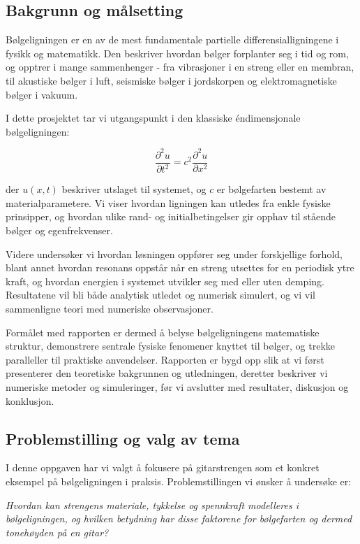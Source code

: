 \subsection{Bakgrunn og målsetting}
Bølgeligningen er en av de mest fundamentale partielle differensialligningene i fysikk og matematikk. 
Den beskriver hvordan bølger forplanter seg i tid og rom, og opptrer i mange sammenhenger - fra 
vibrasjoner i en streng eller en membran, til akustiske bølger i luft, seismiske bølger i jordskorpen 
og elektromagnetiske bølger i vakuum. 

I dette prosjektet tar vi utgangspunkt i den klassiske éndimensjonale bølgeligningen:

\begin{equation}
    \frac{\partial^2 u}{\partial t^2} = c^2 \frac{\partial^2 u}{\partial x^2}
    \label{eq:bølgeligningen}
\end{equation}

der $u(x,t)$ beskriver utslaget til systemet, og $c$ er bølgefarten bestemt av materialparametere. 
Vi viser hvordan ligningen kan utledes fra enkle fysiske prinsipper, og hvordan ulike rand- og 
initialbetingelser gir opphav til stående bølger og egenfrekvenser. 

Videre undersøker vi hvordan løsningen oppfører seg under forskjellige forhold, blant annet hvordan 
resonans oppstår når en streng utsettes for en periodisk ytre kraft, og hvordan energien i systemet 
utvikler seg med eller uten demping. Resultatene vil bli både analytisk utledet og numerisk simulert, 
og vi vil sammenligne teori med numeriske observasjoner. 

Formålet med rapporten er dermed å belyse bølgeligningens matematiske struktur, demonstrere sentrale 
fysiske fenomener knyttet til bølger, og trekke paralleller til praktiske anvendelser. Rapporten er 
bygd opp slik at vi først presenterer den teoretiske bakgrunnen og utledningen, deretter beskriver vi 
numeriske metoder og simuleringer, før vi avslutter med resultater, diskusjon og konklusjon.

\subsection{Problemstilling og valg av tema}

I denne oppgaven har vi valgt å fokusere på gitarstrengen som et konkret eksempel på
bølgeligningen i praksis. Problemstillingen vi ønsker å undersøke er:

\begin{center}
    \textit{Hvordan kan strengens materiale, tykkelse og spennkraft modelleres i bølgeligningen, 
    og hvilken betydning har disse faktorene for bølgefarten og dermed tonehøyden på en gitar?}
\end{center}

